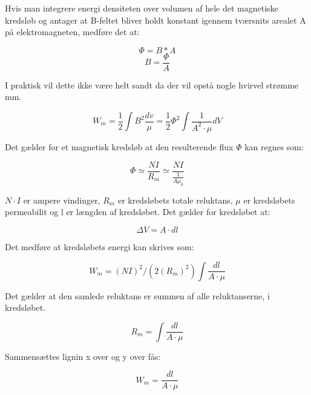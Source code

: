 Hvis man integrere energi densiteten over volumen af hele det magnetiske kredsløb og antager at B-feltet bliver holdt konstant igennem tværsnits arealet A på elektromagneten, medføre det at:

\begin{equation}
\Phi=B*A
\end{equation}
\begin{equation}
B=\frac{\Phi}{A}
\end{equation}


I praktisk vil dette ikke være helt sandt da der vil opstå nogle hvirvel strømme mm.

\begin{equation}
W_m = \frac{1}{2} \int B^2 \frac{dv}{\mu}  = \frac{1}{2} \Phi^2 \int \frac{1}{A^2 \cdot \mu} dV
\end{equation}

Det gælder for et magnetisk kredsløb at den resulterende flux $\Phi$ kan regnes som:

\begin{equation}
\Phi \simeq \frac{NI}{R_m} \simeq  \frac{NI}{\frac{1}{A\mu_0}}
\end{equation}

$N \cdot I$ er ampere vindinger, $R_m$ er kredsløbets totale reluktans, $ \mu $ er kredsløbets permeabilit og l er længden af kredsløbet. Det gælder for kredsløbet at:

\begin{equation}
\Delta V =A \cdot dl
\end{equation}

Det medføre at kredsløbets energi kan skrives som:

\begin{equation}
W_m = (NI)^2/(2(R_m)^2) \int \frac{dl}{A \cdot \mu}
\end{equation}

Det gælder at den samlede reluktans er summen af alle reluktanserne, i kredsløbet.

\begin{equation}
R_m = \int \frac{dl}{A \cdot \mu}
\end{equation}

Sammensættes lignin x over og y over fås:

\begin{equation}
W_m = \frac{dl}{A \cdot \mu}
\end{equation}

